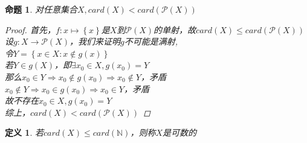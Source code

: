 \documentclass[12pt, a4paper, oneside]{ctexbook}
\newtheorem{definition}[theorem]{定义}
\newtheorem{proposition}[theorem]{命题}
\begin{document}
\begin{proposition}
    对任意集合$X,card(X)<card(\mathcal{P}(X))$
    \begin{proof}
        首先，$f:x\mapsto \left\{x\right\}$是$X$到$\mathcal{P}(X)$的单射，故$card(X)\leq card(\mathcal{P}(X))$\\
        设$g:X\rightarrow \mathcal{P}(X)$，我们来证明$g$不可能是满射,\\
        令$Y=\left\{x\in X:x\notin g(x)\right\}$\\
        若$Y\in g(X)$，即$\exists x_0\in X,g(x_0)=Y$\\
        那么$x_0\in Y\Rightarrow x_0\notin g(x_0)\Rightarrow x_0\notin Y$，矛盾\\
        $x_0\notin Y\Rightarrow x_0\in g(x_0)\Rightarrow x_0\in Y$，矛盾\\
        故不存在$x_0\in X,g(x_0)=Y$\\
        综上，$card(X)<card(\mathcal{P}(X))$
    \end{proof}
\end{proposition}
\begin{definition}
    若$card(X)\leq card(\mathbb{N})$，则称$X$是可数的
\end{definition}
\end{document}
